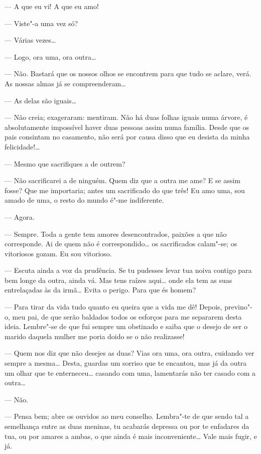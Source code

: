 --- A que eu vi! A que eu amo!

--- Viste"-a uma vez só?

--- Várias vezes\ldots{}

--- Logo, ora uma, ora outra\ldots{}

--- Não. Bastará que os nossos olhos se encontrem para que tudo se
aclare, verá. As nossas almas já se compreenderam\ldots{}

--- As delas são iguais\ldots{}

--- Não creia; exageraram: mentiram. Não há duas folhas iguais numa
árvore, é absolutamente impossível haver duas pessoas assim numa
família. Desde que os pais consintam no casamento, não será por causa
disso que eu desista da minha felicidade!\ldots{}

--- Mesmo que sacrifiques a de outrem?

--- Não sacrificarei a de ninguém. Quem diz que a outra me ame? E se
assim fosse? Que me importaria; antes um sacrificado do que três! Eu amo
uma, sou amado de uma, o resto do mundo é"-me indiferente.

--- Agora.

--- Sempre. Toda a gente tem amores desencontrados, paixões a que não
corresponde. Ai de quem não é correspondido\ldots{} os sacrificados calam"-se;
os vitoriosos gozam. Eu sou vitorioso.

--- Escuta ainda a voz da prudência. Se tu pudesses levar tua noiva
contigo para bem longe da outra, ainda vá. Mas tens raízes aqui\ldots{} onde
ela tem as suas entrelaçadas às da irmã\ldots{} Evita o perigo. Para que és
homem?

--- Para tirar da vida tudo quanto eu queira que a vida me dê! Depois,
previno"-o, meu pai, de que serão baldados todos os esforços para me
separarem desta ideia. Lembre"-se de que fui sempre um obstinado e saiba
que o desejo de ser o marido daquela mulher me poria doido se o não
realizasse!

--- Quem nos diz que não desejes as duas? Vias ora uma, ora outra,
cuidando ver sempre a mesma\ldots{} Desta, guardas um sorriso que te
encantou, mas já da outra um olhar que te enterneceu\ldots{} casando com uma,
lamentarás não ter casado com a outra\ldots{}

--- Não.

--- Pensa bem; abre os ouvidos ao meu conselho. Lembra"-te de que sendo
tal a semelhança entre as duas meninas, tu acabarás depressa ou por te
enfadares da tua, ou por amares a ambas, o que ainda é mais
inconveniente\ldots{} Vale mais fugir, e já.

